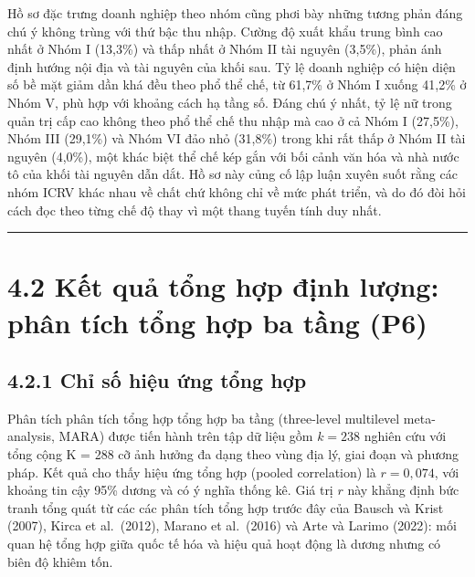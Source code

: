 \documentclass[
  a4paper,
  13pt]{extreport}
\begin{document}
Hồ sơ đặc trưng doanh nghiệp theo nhóm cũng phơi bày những tương phản
đáng chú ý không trùng với thứ bậc thu nhập. Cường độ xuất khẩu trung
bình cao nhất ở Nhóm I (13,3\%) và thấp nhất ở Nhóm II tài nguyên
(3,5\%), phản ánh định hướng nội địa và tài nguyên của khối sau. Tỷ lệ
doanh nghiệp có hiện diện số bề mặt giảm dần khá đều theo phổ thể chế,
từ 61,7\% ở Nhóm I xuống 41,2\% ở Nhóm V, phù hợp với khoảng cách hạ
tầng số. Đáng chú ý nhất, tỷ lệ nữ trong quản trị cấp cao không theo phổ
thể chế thu nhập mà cao ở cả Nhóm I (27,5\%), Nhóm III (29,1\%) và Nhóm
VI đảo nhỏ (31,8\%) trong khi rất thấp ở Nhóm II tài nguyên (4,0\%), một
khác biệt thể chế kép gắn với bối cảnh văn hóa và nhà nước tô của khối
tài nguyên dẫn dắt. Hồ sơ này củng cố lập luận xuyên suốt rằng các nhóm
ICRV khác nhau về chất chứ không chỉ về mức phát triển, và do đó đòi hỏi
cách đọc theo từng chế độ thay vì một thang tuyến tính duy nhất.

\begin{center}\rule{0.5\linewidth}{0.5pt}\end{center}

\hypertarget{kux1ebft-quux1ea3-tux1ed5ng-hux1ee3p-ux111ux1ecbnh-lux1b0ux1ee3ng-phuxe2n-tuxedch-tux1ed5ng-hux1ee3p-ba-tux1ea7ng-p6}{%
\section{4.2 Kết quả tổng hợp định lượng: phân tích tổng hợp ba tầng
(P6)}\label{kux1ebft-quux1ea3-tux1ed5ng-hux1ee3p-ux111ux1ecbnh-lux1b0ux1ee3ng-phuxe2n-tuxedch-tux1ed5ng-hux1ee3p-ba-tux1ea7ng-p6}}

\hypertarget{chux1ec9-sux1ed1-hiux1ec7u-ux1ee9ng-tux1ed5ng-hux1ee3p}{%
\subsection{4.2.1 Chỉ số hiệu ứng tổng
hợp}\label{chux1ec9-sux1ed1-hiux1ec7u-ux1ee9ng-tux1ed5ng-hux1ee3p}}

Phân tích phân tích tổng hợp tổng hợp ba tầng (three-level multilevel
meta-analysis, MARA) được tiến hành trên tập dữ liệu gồm \(k = 238\)
nghiên cứu với tổng cộng K = 288 cỡ ảnh hưởng đa dạng theo vùng địa lý,
giai đoạn và phương pháp. Kết quả cho thấy hiệu ứng tổng hợp (pooled
correlation) là \(r = 0{,}074\), với khoảng tin cậy 95\% dương và có ý
nghĩa thống kê. Giá trị \(r\) này khẳng định bức tranh tổng quát từ các
các phân tích tổng hợp trước đây của Bausch và Krist (2007), Kirca et
al.~(2012), Marano et al.~(2016) và Arte và Larimo (2022): mối quan hệ
tổng hợp giữa quốc tế hóa và hiệu quả hoạt động là dương nhưng có biên
độ khiêm tốn.
\end{document}
